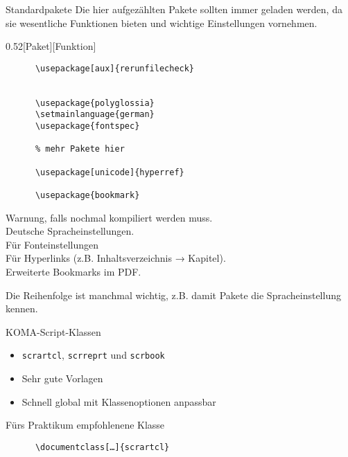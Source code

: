 \begin{frame}[fragile]{Standardpakete}
  Die hier aufgezählten Pakete sollten immer geladen werden, da sie wesentliche Funktionen bieten und wichtige Einstellungen vornehmen.
  \vspace{-1em}
  \begin{CodeExplanation}{0.52}[Paket][Funktion]
    \begin{lstlisting}
      \usepackage[aux]{rerunfilecheck}


      \usepackage{polyglossia}
      \setmainlanguage{german}
      \usepackage{fontspec}

      % mehr Pakete hier

      \usepackage[unicode]{hyperref}

      \usepackage{bookmark}
    \end{lstlisting}
  \Explanation
    \strut
    Warnung, falls nochmal kompiliert werden muss. \\[\baselineskip]
  Deutsche Spracheinstellungen. \\[\baselineskip]
    Für Fonteinstellungen \\[3\baselineskip]
    Für Hyperlinks (z.B. Inhaltsverzeichnis → Kapitel). \\
    Erweiterte Bookmarks im PDF.
  \end{CodeExplanation}
  Die Reihenfolge ist manchmal wichtig, z.B. damit Pakete die Spracheinstellung kennen.
\end{frame}

\begin{frame}[fragile]{
  KOMA-Script-Klassen
  \hfill
}
  \begin{itemize}
    \item \texttt{scrartcl}, \texttt{scrreprt} und \texttt{scrbook}
    \item Sehr gute Vorlagen
    \item Schnell global mit Klassenoptionen anpassbar
  \end{itemize}
  \begin{block}{Fürs Praktikum empfohlenene Klasse}
    \begin{lstlisting}
      \documentclass[…]{scrartcl}
    \end{lstlisting}
  \end{block}
\end{frame}

